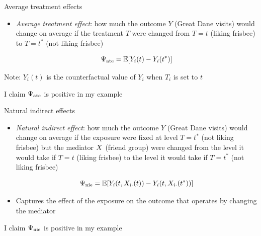 \documentclass{beamer}
\theoremstyle{remark}
\begin{document}
\begin{frame}{Average treatment effects}

    \begin{itemize}
        \item \emph{Average treatment effect}: how much the outcome $Y$ (Great Dane visits) would change on average if the treatment $T$ were changed from $T = t$ (liking frisbee) to $T = t^*$ (not liking frisbee)

              \begin{equation*}
                  \ate = \E{Y_i(t) - Y_i(t^*)}
              \end{equation*}
    \end{itemize}

    Note: $Y_i(t)$ is the counterfactual value of $Y_i$ when $T_i$ is set to $t$

    I claim $\Psi_\mathrm{ate}$ is positive in my example

\end{frame}


\begin{frame}{Natural indirect effects}

    \begin{itemize}
        \item \emph{Natural indirect effect}: how much the outcome $Y$ (Great Dane visits) would change on average if the exposure were fixed at level $T = t^*$ (not liking frisbee) but the mediator $X$ (friend group) were changed from the level it would take if $T = t$ (liking frisbee) to the level it would take if $T = t^*$ (not liking frisbee)

              \begin{equation*}
                  \nie = \E{Y_i (t, \X_{i \cdot}(t)) - Y_i (t, \X_{i \cdot} (t^*))}
              \end{equation*}

        \item Captures the effect of the exposure on the outcome that operates by changing the mediator
    \end{itemize}

    I claim $\Psi_\mathrm{nie}$ is positive in my example

\end{frame}
\end{document}
